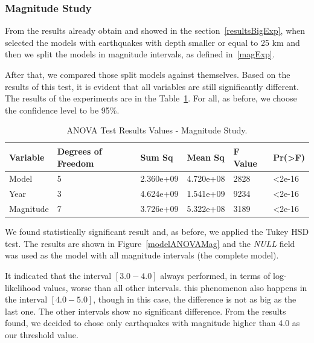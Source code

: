 \subsubsection{Magnitude Study}
From the results already obtain and showed in the section~\ref{resultsBigExp}, when selected the models with earthquakes with depth smaller or equal to 25 km and then we split the models in magnitude intervals, as defined in~\ref{magExp}.

After that, we compared those split models against themselves. Based on the results of this test, it is evident that all variables are still significantly different. The results of the experiments are in the Table~\ref{anovatestMag}. For all, as before, we choose the confidence level to be 95\%.


\begin{table}[!ht]
	\centering
	\begin{tabular}{|l|l|l|l|l|l|}
		\hline
		{Variable} & {Degrees of Freedom} & {Sum Sq}    & {Mean Sq}   & {F Value} & {Pr(\textgreater F)} \\
		\hline
		Model       & 5            	  & 2.360e+09      & 4.720e+08     & 2828     & \textless2e-16     \\
		\hline
		Year        & 3                  & 4.624e+09   & 1.541e+09    & 9234     & \textless2e-16     \\
		\hline
		Magnitude   & 7                  & 3.726e+09   & 5.322e+08    & 3189     & \textless2e-16	\\    
		\hline
	\end{tabular}
	\caption{ANOVA Test Results Values - Magnitude Study.}
	\label{anovatestMag}
\end{table}

We found statistically significant result and, as before, we applied the Tukey HSD test. The results are shown in Figure~\ref{modelANOVAMag} and the \textit{NULL} field was used as the model with all magnitude intervals (the complete model).

It indicated that the interval $[3.0-4.0]$ always performed, in terms of log-likelihood values, worse than all other intervals. this phenomenon also happens in the interval $[4.0-5.0]$, though in this case, the difference is not as big as the last one. The other intervals show no significant difference.
From the results found, we decided to chose only earthquakes with magnitude higher than 4.0 as our threshold value.

